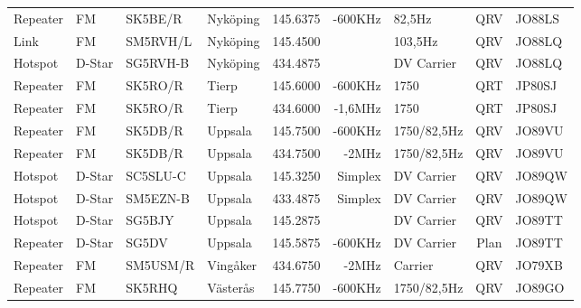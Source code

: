 \begin{landscape}
\begin{longtable}{llllrrlcl}
	Repeater          & FM           & SK5BE/R       & Nyköping          &          145.6375 &        -600KHz & 82,5Hz          &       QRV       & JO88LS           \\
	Link              & FM           & SM5RVH/L      & Nyköping          &          145.4500 &                & 103,5Hz         &       QRV       & JO88LQ           \\
	Hotspot           & D-Star       & SG5RVH-B      & Nyköping          &          434.4875 &                & DV Carrier      &       QRV       & JO88LQ           \\
	Repeater          & FM           & SK5RO/R       & Tierp             &          145.6000 &        -600KHz & 1750            &       QRT       & JP80SJ           \\
	Repeater          & FM           & SK5RO/R       & Tierp             &          434.6000 &        -1,6MHz & 1750            &       QRT       & JP80SJ           \\
	Repeater          & FM           & SK5DB/R       & Uppsala           &          145.7500 &        -600KHz & 1750/82,5Hz     &       QRV       & JO89VU           \\
	Repeater          & FM           & SK5DB/R       & Uppsala           &          434.7500 &          -2MHz & 1750/82,5Hz     &       QRV       & JO89VU           \\
	Hotspot           & D-Star       & SC5SLU-C      & Uppsala           &          145.3250 &        Simplex & DV Carrier      &       QRV       & JO89QW           \\
	Hotspot           & D-Star       & SM5EZN-B      & Uppsala           &          433.4875 &        Simplex & DV Carrier      &       QRV       & JO89QW           \\
	Hotspot           & D-Star       & SG5BJY        & Uppsala           &          145.2875 &                & DV Carrier      &       QRV       & JO89TT           \\
	Repeater          & D-Star       & SG5DV         & Uppsala           &          145.5875 &        -600KHz & DV Carrier      &      Plan       & JO89TT           \\
	Repeater          & FM           & SM5USM/R      & Vingåker          &          434.6750 &          -2MHz & Carrier         &       QRV       & JO79XB           \\
	Repeater          & FM           & SK5RHQ        & Västerås          &          145.7750 &        -600KHz & 1750/82,5Hz     &       QRV       & JO89GO
\end{longtable}
\normalsize

\end{landscape}
